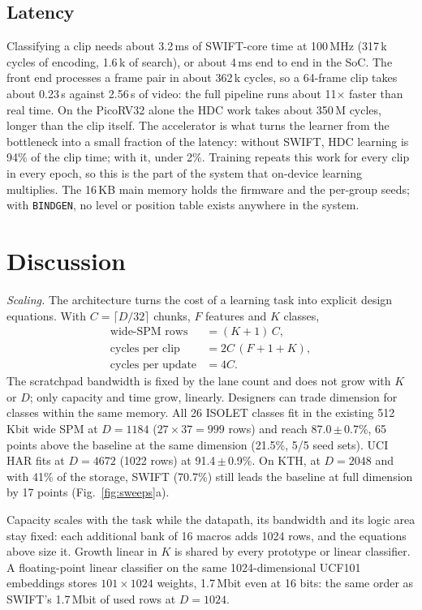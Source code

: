 \documentclass[conference]{IEEEtran}
\begin{document}
\subsection{Latency}
\label{sec:lat}
Classifying a clip needs about 3.2\,ms of SWIFT-core time at 100\,MHz (317\,k cycles of encoding, 1.6\,k of search), or about 4\,ms end to end in the SoC. The front end processes a frame pair in about 362\,k cycles, so a 64-frame clip takes about 0.23\,s against 2.56\,s of video: the full pipeline runs about 11$\times$ faster than real time. On the PicoRV32 alone the HDC work takes about 350\,M cycles, longer than the clip itself. The accelerator is what turns the learner from the bottleneck into a small fraction of the latency: without SWIFT, HDC learning is 94\% of the clip time; with it, under 2\%. Training repeats this work for every clip in every epoch, so this is the part of the system that on-device learning multiplies. The 16\,KB main memory holds the firmware and the per-group seeds; with \texttt{BINDGEN}, no level or position table exists anywhere in the system.

\section{Discussion}
\label{sec:disc}
\emph{Scaling.} The architecture turns the cost of a learning task into explicit design equations. With $C=\lceil D/32\rceil$ chunks, $F$ features and $K$ classes,
\begin{align}
\text{wide-SPM rows} &= (K{+}1)\,C, \nonumber\\
\text{cycles per clip} &= 2C\,(F + 1 + K), \nonumber\\
\text{cycles per update} &= 4C. \nonumber
\end{align}
The scratchpad bandwidth is fixed by the lane count and does not grow with $K$ or $D$; only capacity and time grow, linearly. Designers can trade dimension for classes within the same memory. All 26 ISOLET classes fit in the existing 512\,Kbit wide SPM at $D{=}1184$ ($27\times37=999$ rows) and reach 87.0\,$\pm$\,0.7\%, 65 points above the baseline at the same dimension (21.5\%, 5/5 seed sets). UCI HAR fits at $D{=}4672$ (1022 rows) at 91.4\,$\pm$\,0.9\%. On KTH, at $D{=}2048$ and with 41\% of the storage, SWIFT (70.7\%) still leads the baseline at full dimension by 17 points (Fig.~\ref{fig:sweeps}a).

Capacity scales with the task while the datapath, its bandwidth and its logic area stay fixed: each additional bank of 16 macros adds 1024 rows, and the equations above size it. Growth linear in $K$ is shared by every prototype or linear classifier. A floating-point linear classifier on the same 1024-dimensional UCF101 embeddings stores $101\times1024$ weights, 1.7\,Mbit even at 16 bits: the same order as SWIFT's 1.7\,Mbit of used rows at $D{=}1024$.
\end{document}
